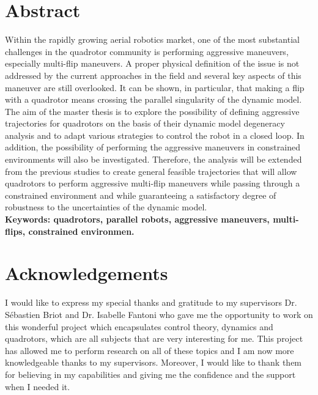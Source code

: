 \documentclass{thesisreport}
\begin{document}
   
 
  \section*{Abstract}
   
Within the rapidly growing aerial robotics market, one of the most substantial challenges in the quadrotor community is performing aggressive maneuvers, especially multi-flip maneuvers.  A proper physical definition of the issue is not addressed by the current approaches in the field and several key aspects of this maneuver are still overlooked.
It can be shown, in particular, that making a flip with a quadrotor means crossing the parallel singularity of the dynamic model. The aim of the master thesis is to explore the possibility of defining aggressive trajectories for quadrotors on the basis of their dynamic model degeneracy analysis and to adapt various strategies to control the robot in a closed loop. In addition, the possibility of performing the aggressive maneuvers in constrained environments will also be investigated.
Therefore, the analysis will be extended from the previous studies to create general feasible trajectories that will allow quadrotors to perform aggressive multi-flip maneuvers while passing through a constrained environment and while guaranteeing a satisfactory degree of robustness to the uncertainties of the dynamic model.\\

\textbf{Keywords: quadrotors, parallel robots, aggressive maneuvers, multi-flips, constrained environmen. }
 
 
 \newpage
 
 \section*{Acknowledgements}
 
 I would like to express my special thanks and gratitude to my supervisors Dr. Sébastien Briot and Dr. Isabelle Fantoni who gave me the  opportunity to work on this wonderful project which encapsulates control theory, dynamics and quadrotors, which are all subjects that are very interesting for me. 
This project has allowed me to perform research on all of these topics and I am now more knowledgeable thanks to my supervisors. Moreover, I would like to thank them for believing in my capabilities and giving me the confidence and the support when I needed it. \\
\end{document}

